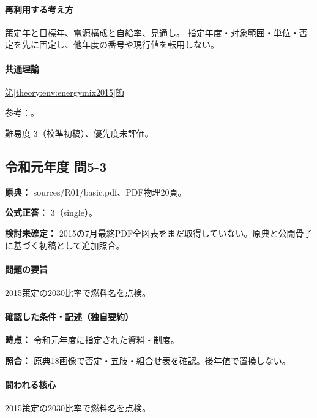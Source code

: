 \paragraph{再利用する考え方} 策定年と目標年、電源構成と自給率、見通し。 指定年度・対象範囲・単位・否定を先に固定し、他年度の番号や現行値を転用しない。

\paragraph{共通理論} \hyperref[theory:env:energymix2015]{第\ref*{theory:env:energymix2015}節}

\par 参考：\cite{env58_mix2015}。

\par 難易度 3（校準初稿）、優先度未評価。

\subsection{令和元年度 問5-3}
\label{q:r01-reg-basic-5-3}

\noindent\textbf{原典：} sources/R01/basic.pdf、PDF物理20頁。

\textbf{公式正答：} 3（single）。

\par\textbf{検討未確定：} 2015の7月最終PDF全図表をまだ取得していない。原典と公開骨子に基づく初稿として追加照合。

\paragraph{問題の要旨} 2015策定の2030比率で燃料名を点検。

\paragraph{確認した条件・記述（独自要約）}\mbox{}\par

\noindent\textbf{時点：} 令和元年度に指定された資料・制度。\par

\noindent\textbf{照合：} 原典18画像で否定・五肢・組合せ表を確認。後年値で置換しない。\par

\paragraph{問われる核心} 2015策定の2030比率で燃料名を点検。

